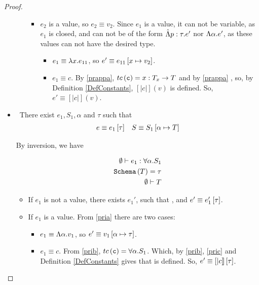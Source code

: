 \begin{proof}
\begin{itemize}
\begin{itemize}
\begin{itemize}
		\item $e_2$ is a value, so $e_2 \equiv v_2$.
		Since $e_1$ is a value, it can not be variable, as $e_1$ is closed,
		and can not be of the form $\hat{\Lambda} p : \tau . e'$ nor $\Lambda \alpha . e'$,
		as these values can not have the desired type. 
		\begin{itemize}
			\item $e_1 \equiv \lambda x . e_{11}$, so $e' \equiv e_{11} \left[ x \mapsto v_2 \right] $.
			\item $e_1 \equiv c$. 
			By \ref{prappa}, $tc\left(\texttt{c}\right) = x : T_x \rightarrow T$
			and by \ref{prappa} , 
            so, by Definition \ref{DefConstants}, $[|c|](v)$ is defined.			
			So, $e' \equiv [|c|](v)$.
		\end{itemize}
	\end{itemize}
\end{itemize}


\item \tinst\ There exist $e_1, S_1, \alpha$ and $\tau$ such that
\begin{align*}
e \equiv {e_1} \left[ {\tau}\right] && S \equiv S_1 \left[ \alpha \mapsto T \right] 
\end{align*}

By inversion, we have

\begin{align}
	\emptyset \vdash e_1 : \forall \alpha . S_1 \label{pria}\\
	\texttt{Schema}\left(T\right) = \tau \label{prib}\\
	\emptyset \vdash T  \label{pric}
\end{align} 

	\begin{itemize}
	\item If $e_1$ is not a value, 
	there exists $e_1'$, such that , 
	and $e' \equiv {e_1'} \left[ {\tau}\right]$.

	\item If $e_1$ is a value. From \ref{pria} there are two cases:

		\begin{itemize}
		\item $e_1 \equiv \Lambda \alpha . v_{1}$, so $e' \equiv v_1 \left[ \alpha \mapsto \tau \right] $.
		\item $e_1 \equiv c$.
		From \ref{prib}, $tc\left(\texttt{c}\right) = \forall \alpha . S_1$.
		Which, by \ref{prib}, \ref{pric} and Definition \ref{DefConstants} gives that 
		\etapp{[|c|]}{\tau} is defined. 
		So, $e' \equiv {[|c|]} \left[ {\tau}\right]$.
		\end{itemize}
 	\end{itemize}



\end{itemize}
\end{proof}
